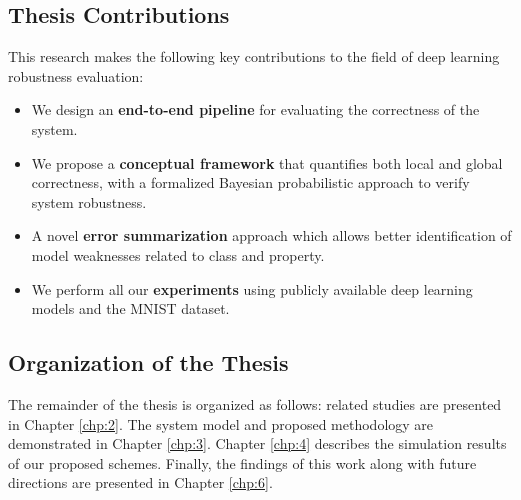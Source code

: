 \subsection{Thesis Contributions}\hypertarget{contributions}{}

This research makes the following key contributions to the field of deep learning robustness evaluation:
\begin{itemize}
    \item We design an \textbf{end-to-end pipeline} for evaluating the correctness of the system.
    \item We propose a \textbf{conceptual framework} that quantifies both local and global correctness, with a formalized Bayesian probabilistic approach to verify system robustness.
    \item A novel \textbf{error summarization} approach which allows better identification of model weaknesses related to class and property.
    \item We perform all our \textbf{experiments} using publicly available deep learning models and the MNIST dataset.
\end{itemize}

\subsection{Organization of the Thesis}\hypertarget{organization of thesis}{}
The remainder of the thesis is organized as follows: related studies are presented in Chapter \ref{chp:2}. The system model and proposed methodology are demonstrated in Chapter \ref{chp:3}. Chapter \ref{chp:4} describes the simulation results of our proposed schemes. Finally, the findings of this work along with future directions are presented in Chapter \ref{chp:6}.

\clearpage
